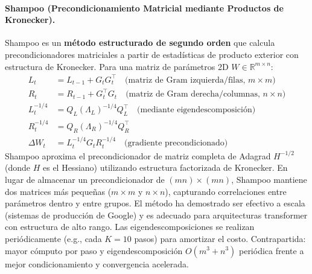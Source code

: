 \paragraph{Shampoo (Precondicionamiento Matricial mediante Productos de Kronecker).}
Shampoo es un \textbf{método estructurado de segundo orden} que calcula precondicionadores matriciales a partir de estadísticas de producto exterior con estructura de Kronecker. Para una matriz de parámetros 2D $W \in \mathbb{R}^{m \times n}$:
\begin{align}
L_t &= L_{t-1} + G_t G_t^\top \quad\text{(matriz de Gram izquierda/filas, $m \times m$)} \\
R_t &= R_{t-1} + G_t^\top G_t \quad\text{(matriz de Gram derecha/columnas, $n \times n$)} \\
L_t^{-1/4} &= Q_L (\Lambda_L)^{-1/4} Q_L^\top \quad\text{(mediante eigendescomposición)} \\
R_t^{-1/4} &= Q_R (\Lambda_R)^{-1/4} Q_R^\top \\
\Delta W_t &= L_t^{-1/4} G_t R_t^{-1/4} \quad\text{(gradiente precondicionado)}
\end{align}
Shampoo aproxima el precondicionador de matriz completa de Adagrad $H^{-1/2}$ (donde $H$ es el Hessiano) utilizando estructura factorizada de Kronecker. En lugar de almacenar un precondicionador de $(mn) \times (mn)$, Shampoo mantiene dos matrices más pequeñas ($m \times m$ y $n \times n$), capturando correlaciones entre parámetros dentro y entre grupos. El método ha demostrado ser efectivo a escala (sistemas de producción de Google) y es adecuado para arquitecturas transformer con estructura de alto rango. Las eigendescomposiciones se realizan periódicamente (e.g., cada $K=10$ pasos) para amortizar el costo. Contrapartida: mayor cómputo por paso y eigendescomposición $O(m^3 + n^3)$ periódica frente a mejor condicionamiento y convergencia acelerada.

